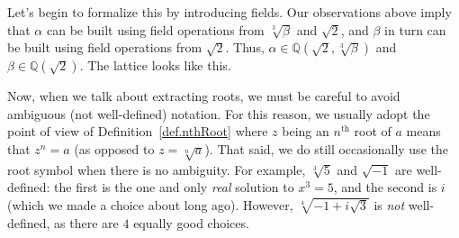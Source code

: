 Let's begin to formalize this by introducing fields. Our observations above imply that $\alpha$ can be built using field operations from $\sqrt[3]{\beta}$ and $\sqrt{2}$, and $\beta$ in turn can be built using field operations from $\sqrt{2}$. Thus, $\alpha \in \mathbb{Q}\left(\sqrt{2},\sqrt[3]{\beta}\right)$ and $\beta \in \mathbb{Q}\left(\sqrt{2}\right)$. The lattice looks like this.
\begin{center}
\end{center}

Now, when we talk about extracting roots, we must be careful to avoid ambiguous (not well-defined) notation. For this reason, we usually adopt the point of view of Definition~\ref{def.nthRoot} where $z$ being an $n^\text{th}$ root of $a$ means that $z^n = a$ (as opposed to  $z = \sqrt[n]{a}$). That said, we do still occasionally use the root symbol when there is no ambiguity. For example, $\sqrt[3]{5}$ and $\sqrt{-1}$ are well-defined: the first is the one and only \emph{real} solution to $x^3=5$, and the second is $i$ (which we made a choice about long ago). However,  $\sqrt[4]{-1 + i\sqrt{3}}$ is \emph{not} well-defined, as there are $4$ equally good choices.

